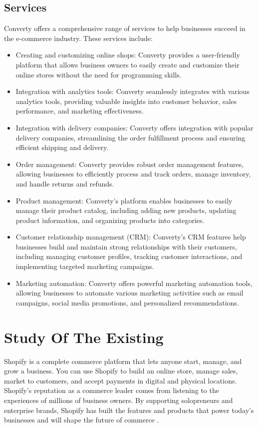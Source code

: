 \subsection{Services}
Converty offers a comprehensive range of services to help businesses succeed in the e-commerce industry. These services include:

\begin{itemize}
  \item Creating and customizing online shops: Converty provides a user-friendly platform that allows business owners to easily create and customize their online stores without the need for programming skills.
  \item Integration with analytics tools: Converty seamlessly integrates with various analytics tools, providing valuable insights into customer behavior, sales performance, and marketing effectiveness.
  \item Integration with delivery companies: Converty offers integration with popular delivery companies, streamlining the order fulfillment process and ensuring efficient shipping and delivery.
  \item Order management: Converty provides robust order management features, allowing businesses to efficiently process and track orders, manage inventory, and handle returns and refunds.
  \item Product management: Converty's platform enables businesses to easily manage their product catalog, including adding new products, updating product information, and organizing products into categories.
  \item Customer relationship management (CRM): Converty's CRM features help businesses build and maintain strong relationships with their customers, including managing customer profiles, tracking customer interactions, and implementing targeted marketing campaigns.
  \item Marketing automation: Converty offers powerful marketing automation tools, allowing businesses to automate various marketing activities such as email campaigns, social media promotions, and personalized recommendations.
\end{itemize}

\section{Study Of The Existing}
Shopify is a complete commerce platform that lets anyone start, manage, and grow a business. You can use Shopify to build an online store, manage sales, market to customers, and accept payments in digital and physical locations. Shopify’s reputation as a commerce leader comes from listening to the experiences of millions of business owners. By supporting solopreneurs and enterprise brands, Shopify has built the features and products that power today’s businesses and will shape the future of commerce \cite{shopifyblog}.

